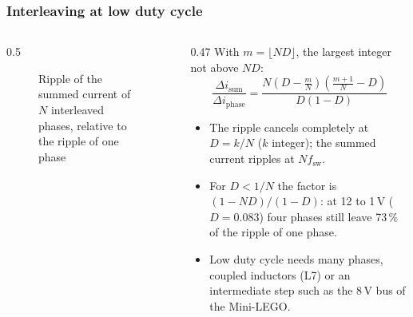 \begin{frame}
	\frametitle{Interleaving at low duty cycle}
	\begin{columns}[T]
		\begin{column}{0.5\textwidth}
			\begin{figure}
				\centering
				\caption{Ripple of the summed current of $N$ interleaved phases, relative to the ripple of one phase}
			\end{figure}
		\end{column}
		\begin{column}{0.47\textwidth}
			\footnotesize
			With $m=\lfloor ND\rfloor$, the largest integer not above $ND$:
			\begin{equation*}
				\frac{\Delta i_\mathrm{sum}}{\Delta i_\mathrm{phase}}=\frac{N\left(D-\frac{m}{N}\right)\left(\frac{m+1}{N}-D\right)}{D(1-D)}
			\end{equation*}
			\begin{itemize}
				\item The ripple cancels completely at $D=k/N$ ($k$ integer); the summed current ripples at $Nf_\mathrm{sw}$.
				\item For $D<1/N$ the factor is $(1-ND)/(1-D)$: at 12 to 1\,V ($D=0.083$) four phases still leave 73\,\% of the ripple of one phase.
				\item Low duty cycle needs many phases, coupled inductors (L7) or an intermediate step such as the 8\,V bus of the Mini-LEGO.
			\end{itemize}
		\end{column}
	\end{columns}
\end{frame}

